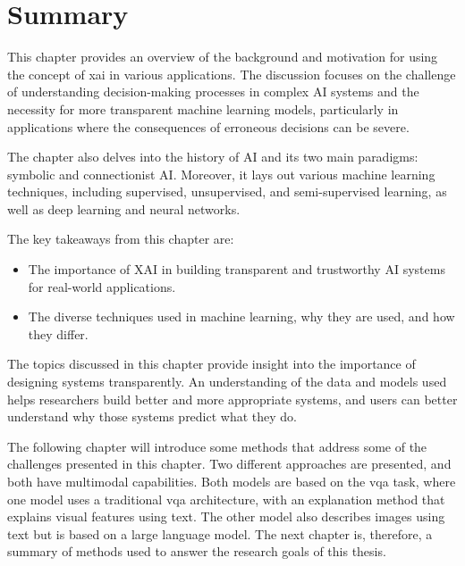 \section{Summary}
\label{sec:2_summary}

\begin{comment}
SUMMARY: Often, we recommend ending this chapter (and all chapters after except the conclusion) with a summary section. The aim is to give an overview of, and tea-spoon-feeding the reader with, what he/she should have learned reading this chapter. What can be concluded from this chapter? 
How does the information given here give arguments for your problem statement? Finally, lead to the next chapter (“... and we will therefore in the next chapter address these challenges, and describe our ideas/implementation/...”)
\end{comment}


This chapter provides an overview of the background and motivation for using the concept of \gls{xai} in various applications. 
The discussion focuses on the challenge of understanding decision-making processes in complex AI systems and the necessity for more transparent machine learning models, particularly in applications where the consequences of erroneous decisions can be severe. 


The chapter also delves into the history of AI and its two main paradigms: symbolic and connectionist AI. 
Moreover, it lays out various machine learning techniques, including supervised, unsupervised, and semi-supervised learning, as well as deep learning and neural networks.


The key takeaways from this chapter are:

\begin{itemize}
    \item The importance of XAI in building transparent and trustworthy AI systems for real-world applications.
    \item The diverse techniques used in machine learning, why they are used, and how they differ.
\end{itemize}

The topics discussed in this chapter provide insight into the importance of designing systems transparently. An understanding of the data and models used helps researchers build better and more appropriate systems, and users can better understand why those systems predict what they do.

\begin{comment}
    How does the information given here give arguments for your problem statement?
\end{comment}


The following chapter will introduce some methods that address some of the challenges presented in this chapter. Two different approaches are presented, and both have multimodal capabilities. Both models are based on the \gls{vqa} task, where one model uses a traditional \gls{vqa} architecture, with an explanation method that explains visual features using text. The other model also describes images using text but is based on a large language model. 
The next chapter is, therefore, a summary of methods used to answer the research goals of this thesis.